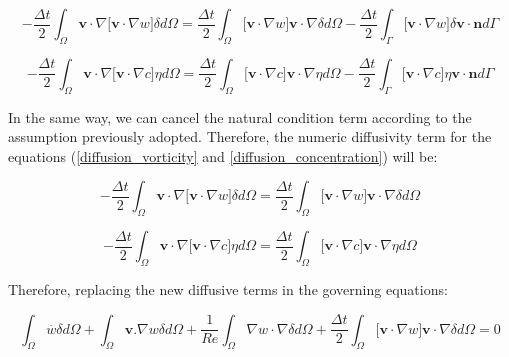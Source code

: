 \begin{equation}
 - \frac{\Delta t}{2} \int_{\Omega} \textbf{v} \cdot \nabla \big[ \textbf{v} \cdot \nabla w \big] \delta d\Omega
 = 
 \frac{\Delta t}{2} \int_{\Omega} \big[ \textbf{v} \cdot \nabla w \big] \textbf{v} \cdot \nabla \delta d\Omega
 - \frac{\Delta t}{2} \int_{\Gamma} \big[ \textbf{v} \cdot \nabla w \big] \delta \textbf{v} \cdot \textbf{n} d\Gamma
\end{equation}

\begin{equation}
 - \frac{\Delta t}{2} \int_{\Omega} \textbf{v} \cdot \nabla \big[ \textbf{v} \cdot \nabla c \big] \eta d\Omega
 = 
 \frac{\Delta t}{2} \int_{\Omega} \big[ \textbf{v} \cdot \nabla c \big] \textbf{v} \cdot \nabla \eta d\Omega
 - \frac{\Delta t}{2} \int_{\Gamma} \big[ \textbf{v} \cdot \nabla c \big] \eta \textbf{v} \cdot \textbf{n} d\Gamma
\end{equation}


\newpage
In the same way, we can cancel the natural condition term 
according to the assumption previously adopted. 
Therefore, the numeric diffusivity term for the equations 
(\ref{diffusion_vorticity} and \ref{diffusion_concentration}) will be:

\begin{equation}
 - \frac{\Delta t}{2} \int_{\Omega} \textbf{v} \cdot \nabla \big[ \textbf{v} \cdot \nabla w \big] \delta d\Omega
 = 
 \frac{\Delta t}{2} \int_{\Omega} \big[ \textbf{v} \cdot \nabla w \big] \textbf{v} \cdot \nabla \delta d\Omega
\end{equation}

\begin{equation}
 - \frac{\Delta t}{2} \int_{\Omega} \textbf{v} \cdot \nabla \big[ \textbf{v} \cdot \nabla c \big] \eta d\Omega
 = 
 \frac{\Delta t}{2} \int_{\Omega} \big[ \textbf{v} \cdot \nabla c \big] \textbf{v} \cdot \nabla \eta d\Omega
\end{equation}

\medskip
\noindent
Therefore, replacing the new diffusive terms in the governing equations:

\begin{equation} \label{vorticity weak} 
   \int_{\Omega} \overset{.}{w} \delta d\Omega 
 + \int_{\Omega} \textbf{v}.\nabla w \delta d\Omega 
 + \frac{1}{\textit{Re}} \int_{\Omega} \nabla w \cdot \nabla \delta d\Omega 
 + \frac{\Delta t}{2} \int_{\Omega} \big[ \textbf{v} \cdot \nabla w \big] \textbf{v} \cdot \nabla \delta d\Omega
 = 0
\end{equation}

